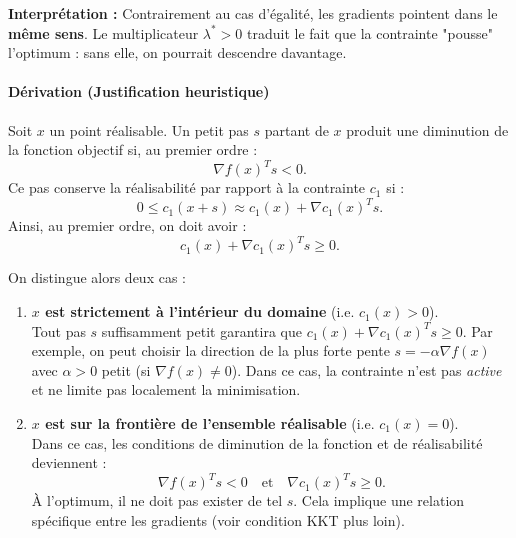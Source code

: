\begin{figureexplanation}
\textbf{Interprétation :} Contrairement au cas d'égalité, les gradients pointent dans le \textbf{même sens}. Le multiplicateur $\lambda^* > 0$ traduit le fait que la contrainte "pousse" l'optimum : sans elle, on pourrait descendre davantage.
\end{figureexplanation}

\paragraph{Dérivation (Justification heuristique)}
Soit $x$ un point réalisable.
Un petit pas $s$ partant de $x$ produit une diminution de la fonction objectif si, au premier ordre :
\begin{equation}
    \nabla f(x)^T s < 0.
\end{equation}
Ce pas conserve la réalisabilité par rapport à la contrainte $c_1$ si :
\begin{equation}
    0 \le c_1(x+s) \approx c_1(x) + \nabla c_1(x)^T s.
\end{equation}
Ainsi, au premier ordre, on doit avoir :
\begin{equation}
    c_1(x) + \nabla c_1(x)^T s \ge 0.
\end{equation}

On distingue alors deux cas :
\begin{enumerate}
    \item \textbf{$x$ est strictement à l'intérieur du domaine} (i.e. $c_1(x) > 0$). \\
    Tout pas $s$ suffisamment petit garantira que $c_1(x) + \nabla c_1(x)^T s \ge 0$. Par exemple, on peut choisir la direction de la plus forte pente $s = -\alpha \nabla f(x)$ avec $\alpha > 0$ petit (si $\nabla f(x) \neq 0$). Dans ce cas, la contrainte n'est pas \textit{active} et ne limite pas localement la minimisation.
    
    \item \textbf{$x$ est sur la frontière de l'ensemble réalisable} (i.e. $c_1(x) = 0$). \\
    Dans ce cas, les conditions de diminution de la fonction et de réalisabilité deviennent :
    \begin{equation}
        \nabla f(x)^T s < 0 \quad \text{et} \quad \nabla c_1(x)^T s \ge 0.
    \end{equation}
    À l'optimum, il ne doit pas exister de tel $s$. Cela implique une relation spécifique entre les gradients (voir condition KKT plus loin).
\end{enumerate}



